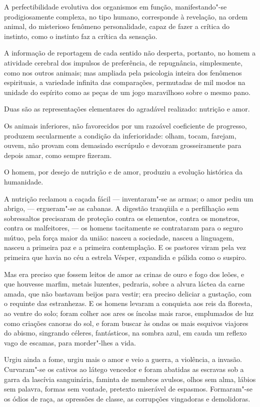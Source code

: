 A perfectibilidade evolutiva dos organismos em função,
manifestando"-se prodigiosamente complexa, no tipo humano, corresponde
à revelação, na ordem animal, do misterioso fenômeno personalidade,
capaz de fazer a crítica do instinto, como o instinto faz a crítica da
sensação. 

A informação de reportagem de cada sentido não desperta,
portanto, no homem a atividade cerebral dos impulsos de preferência, de
repugnância, simplesmente, como nos outros animais; mas ampliada pela
psicologia inteira dos fenômenos espirituais, a variedade infinita das
comparações, permutadas de mil modos na unidade do espírito como as
peças de um jogo maravilhoso sobre o mesmo pano. 

Duas são as representações elementares do agradável realizado: nutrição e amor. 

Os animais inferiores, não favorecidos por um razoável coeficiente de
progresso, produzem secularmente a condição da inferioridade: olham,
tocam, farejam, ouvem, não provam com demasiado escrúpulo e devoram
grosseiramente para depois amar, como sempre fizeram. 

O homem, por
desejo de nutrição e de amor, produziu a evolução histórica da
humanidade. 

A nutrição reclamou a caçada fácil --- inventaram"-se as
armas; o amor pediu um abrigo, --- ergueram"-se as cabanas. A digestão
tranqüila e a perfilhação sem sobressaltos precisaram de proteção
contra os elementos, contra os monstros, contra os malfeitores, --- os
homens tacitamente se contrataram para o seguro mútuo, 
pela força maior da união: nasceu a sociedade, nasceu a
linguagem, nasceu a primeira paz e a primeira contemplação. E os
pastores viram pela vez primeira que havia no céu a estrela Vésper,
expandida e pálida como o suspiro. 

Mas era preciso que fossem leitos de
amor as crinas de ouro e fogo dos leões, e que houvesse marfim, metais
luzentes, pedraria, sobre a alvura láctea da carne amada, que não
bastavam beijos para vestir; era preciso deliciar a gustação, com o
requinte das estranhezas. E os homens levaram a conquista aos reis da
floresta, ao ventre do solo; foram colher aos ares os íncolas mais
raros, emplumados de luz como criações canoras do sol, e foram buscar
às ondas os mais esquivos viajores do abismo, singrando céleres,
fantásticos, na sombra azul, em cauda um reflexo vago de escamas, para
morder"-lhes a vida. 

Urgiu ainda a fome, urgiu mais o amor e veio a
guerra, a violência, a invasão. Curvaram"-se os cativos ao látego
vencedor e foram abatidas as escravas sob a garra da lascívia
sanguinária, faminta de membros avulsos, olhos sem alma, lábios sem
palavra, formas sem vontade, pretexto miserável de espasmos.
Formaram"-se os ódios de raça, as opressões de classe, as corrupções
vingadoras e demolidoras. 

